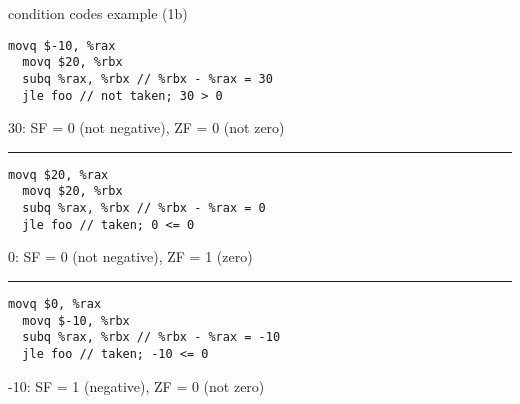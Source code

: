 \begin{frame}[fragile,label=ccEx1b]{condition codes example (1b)}
\begin{lstlisting}[style=small]
  movq $-10, %rax
  movq $20, %rbx
  subq %rax, %rbx // %rbx - %rax = 30 
  jle foo // not taken; 30 > 0
\end{lstlisting}
30: SF = 0 (not negative), ZF = 0 (not zero)
\hrule
\begin{lstlisting}[style=small]
  movq $20, %rax
  movq $20, %rbx
  subq %rax, %rbx // %rbx - %rax = 0
  jle foo // taken; 0 <= 0
\end{lstlisting}
0: SF = 0 (not negative), ZF = 1 (zero)
\hrule
\begin{lstlisting}[style=small]
  movq $0, %rax
  movq $-10, %rbx
  subq %rax, %rbx // %rbx - %rax = -10
  jle foo // taken; -10 <= 0
\end{lstlisting}
-10: SF = 1 (negative), ZF = 0 (not zero)
\end{frame}

